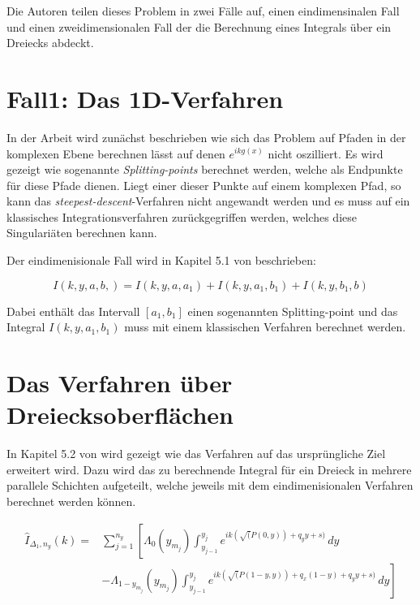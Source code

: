 Die Autoren teilen dieses Problem in zwei Fälle auf, einen eindimensinalen Fall und einen zweidimensionalen Fall der die Berechnung eines Integrals über ein Dreiecks abdeckt.


\section{Fall1: Das 1D-Verfahren}

In der Arbeit \cite{gasperini:hal-03209144} wird zunächst beschrieben wie sich das Problem auf Pfaden in der komplexen Ebene berechnen lässt auf denen $e^{ikg(x)}$ nicht oszilliert.
Es wird gezeigt wie sogenannte \textit{Splitting-points} berechnet werden, welche als Endpunkte für diese Pfade dienen.
Liegt einer dieser Punkte auf einem komplexen Pfad, so kann das \textit{steepest-descent}-Verfahren nicht angewandt werden und es muss auf ein klassisches Integrationsverfahren zurückgegriffen werden, welches diese Singulariäten berechnen kann.

Der eindimenisionale Fall wird in Kapitel 5.1 von \cite{gasperini:hal-03209144} beschrieben: 

\begin{equation}
    I(k,y,a,b,) = I(k,y,a,a_1) + I(k,y,a_1, b_1) + I(k,y,b_1,b)
\end{equation}

Dabei enthält das Intervall $[a_1,b_1]$ einen sogenannten Splitting-point und das Integral $I(k,y,a_1,b_1)$ muss mit einem klassischen Verfahren berechnet werden.


\section{Das Verfahren über Dreiecksoberflächen}

In Kapitel 5.2 von \cite*{gasperini:hal-03209144} wird gezeigt wie das Verfahren auf das ursprüngliche Ziel erweitert wird.
Dazu wird das zu berechnende Integral für ein Dreieck in mehrere parallele Schichten aufgeteilt, welche jeweils mit dem eindimenisionalen Verfahren berechnet werden können.


\begin{equation}
    \begin{aligned}
        \hat{I}_{\Delta_1,n_y}(k) = & \sum_{j = 1}^{n_y} \left[ \Lambda_0(y_{m_j}) \int_{y_{j-1}}^{y_j}  e^{ik(\sqrt(P(0,y))+q_yy+s)}\,dy \right.\\
        & \left.  - \Lambda_{1-y_{m_j}}(y_{m_j}) \int_{y_{j-1}}^{y_j}  e^{ik(\sqrt(P(1-y,y))+q_x(1-y)+q_yy+s)}\,dy  \right] \\
    \end{aligned}
\end{equation}

